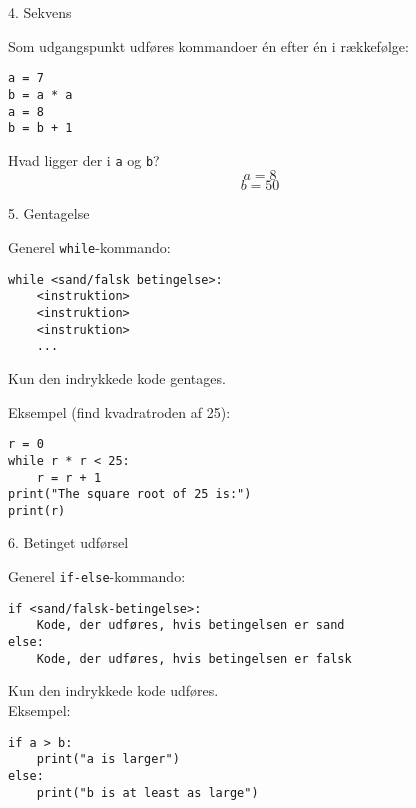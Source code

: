 \documentclass[10pt]{beamer}
\begin{document}

\begin{frame}[fragile]{4. Sekvens}

Som udgangspunkt udføres kommandoer én efter én i rækkefølge:

\begin{lstlisting}[style=python]
a = 7
b = a * a
a = 8
b = b + 1
\end{lstlisting}

Hvad ligger der i \texttt{a} og \texttt{b}?
\pause
$$a = 8$$
$$b = 50$$
\end{frame}


\begin{frame}[fragile]{5. Gentagelse}

Generel \texttt{while}-kommando:

\begin{lstlisting}[style=python]
while <sand/falsk betingelse>:
	<instruktion>
	<instruktion>
	<instruktion>
	...
\end{lstlisting}
Kun den indrykkede kode gentages.

Eksempel (find kvadratroden af 25):

\begin{lstlisting}[style=python]
r = 0
while r * r < 25:
	r = r + 1
print("The square root of 25 is:")
print(r)
\end{lstlisting}

\end{frame}


\begin{frame}[fragile]{6. Betinget udførsel}

Generel \texttt{if-else}-kommando:

\begin{lstlisting}[style=python]
if <sand/falsk-betingelse>:
	Kode, der udføres, hvis betingelsen er sand
else:
	Kode, der udføres, hvis betingelsen er falsk
\end{lstlisting}
Kun den indrykkede kode udføres.\\
\medskip
Eksempel:

\begin{lstlisting}[style=python]
if a > b:
	print("a is larger")
else:
	print("b is at least as large")
\end{lstlisting}
\end{frame}
\end{document}
